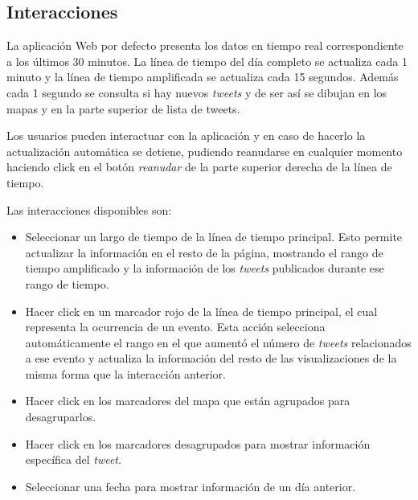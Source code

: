 \subsection{Interacciones}

La aplicación Web por defecto presenta los datos en tiempo real correspondiente a los últimos 30 minutos.
La línea de tiempo del día completo se actualiza cada 1 minuto y la línea de tiempo amplificada se actualiza cada 15 segundos. 
Además cada 1 segundo se consulta si hay nuevos \textit{tweets} y de ser así se dibujan en los mapas y en la parte superior de lista de tweets.  

Los usuarios pueden interactuar con la aplicación y en caso de hacerlo la actualización automática se detiene, pudiendo reanudarse en cualquier momento haciendo click en el botón \textit{reanudar} de la parte superior derecha de la línea de tiempo. 

Las interacciones disponibles son: 

\begin{itemize}
\item Seleccionar un largo de tiempo de la línea de tiempo principal. Esto permite actualizar la información en el resto de la página, mostrando el rango de tiempo amplificado y la información de los \textit{tweets} publicados durante ese rango de tiempo. 
\item Hacer click en un marcador rojo de la línea de tiempo principal, el cual representa la ocurrencia de un evento. Esta acción selecciona automáticamente el rango en el que aumentó el número de \textit{tweets} relacionados a ese evento y actualiza la información del resto de las visualizaciones de la misma forma que la interacción anterior. 
\item Hacer click en los marcadores del mapa que están agrupados para desagruparlos.
\item Hacer click en los marcadores desagrupados para mostrar información específica del \textit{tweet}.
\item Seleccionar una fecha para mostrar información de un día anterior. 
\end{itemize}



